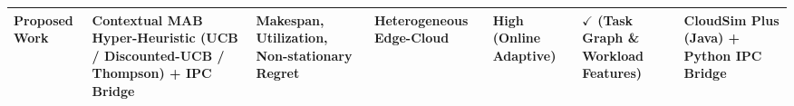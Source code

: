 \begin{table}[H]
{\begin{tabular}{p{3.2cm} p{2.8cm} p{2.5cm} p{2.8cm} p{2.5cm} p{2.2cm} p{2.2cm}}
\midrule
\rowcolor{gray!15}
\textbf{Proposed Work} & \textbf{Contextual MAB Hyper-Heuristic (UCB / Discounted-UCB / Thompson) + IPC Bridge} & \textbf{Makespan, Utilization, Non-stationary Regret} & \textbf{Heterogeneous Edge-Cloud} & \textbf{High (Online Adaptive)} & \textbf{$\checkmark$ (Task Graph \& Workload Features)} & \textbf{CloudSim Plus (Java) + Python IPC Bridge} \\
\bottomrule
\end{tabular}%
}
\end{table}

